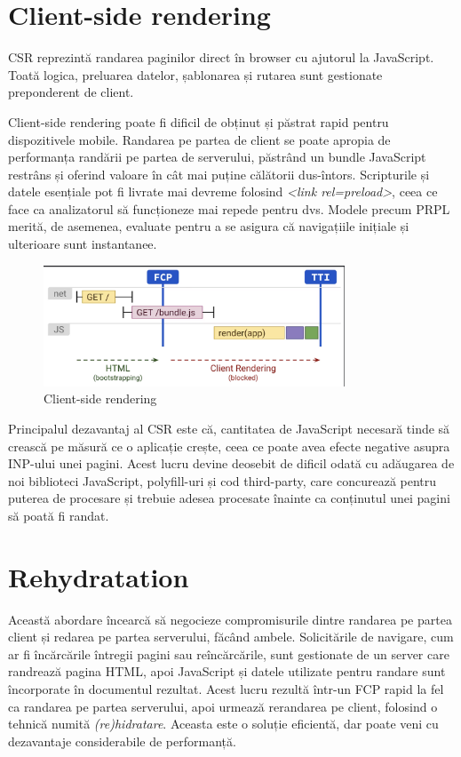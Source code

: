 \documentclass[12pt, a4paper]{report}
\begin{document}
\section{Client-side rendering}
CSR reprezintă randarea paginilor direct în browser cu ajutorul la JavaScript. Toată logica, preluarea datelor, șablonarea și rutarea sunt gestionate preponderent de client.

Client-side rendering poate fi dificil de obținut și păstrat rapid pentru dispozitivele mobile. Randarea pe partea de client se poate apropia de performanța randării pe partea de serverului, păstrând un bundle JavaScript restrâns și oferind valoare în cât mai puține călătorii dus-întors. Scripturile și datele esențiale pot fi livrate mai devreme folosind \emph{<link rel=preload>}, ceea ce face ca analizatorul să funcționeze mai repede pentru dvs. Modele precum PRPL merită, de asemenea, evaluate pentru a se asigura că navigațiile inițiale și ulterioare sunt instantanee.

\begin{figure}[htbp]
	\centering
	\includegraphics[width=0.8\textwidth]{csr.png}
	\caption{Client-side rendering}
	\label{fig:csr}
\end{figure}

Principalul dezavantaj al CSR este că, cantitatea de JavaScript necesară tinde să crească pe măsură ce o aplicație crește, ceea ce poate avea efecte negative asupra INP-ului unei pagini. Acest lucru devine deosebit de dificil odată cu adăugarea de noi biblioteci JavaScript, polyfill-uri și cod third-party, care concurează pentru puterea de procesare și trebuie adesea procesate înainte ca conținutul unei pagini să poată fi randat.

\section{Rehydratation}

Această abordare încearcă să negocieze compromisurile dintre randarea pe partea client și redarea pe partea serverului, făcând ambele. Solicitările de navigare, cum ar fi încărcările întregii pagini sau reîncărcările, sunt gestionate de un server care randrează pagina HTML, apoi JavaScript și datele utilizate pentru randare sunt încorporate în documentul rezultat. Acest lucru rezultă într-un FCP rapid la fel ca randarea pe partea serverului, apoi urmează rerandarea pe client, folosind o tehnică numită \emph{(re)hidratare}. Aceasta este o soluție eficientă, dar poate veni cu dezavantaje considerabile de performanță.
\end{document}
